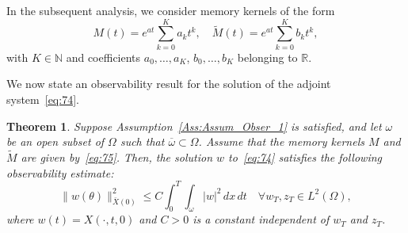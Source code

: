 \documentclass[12pt]{article}
\theoremstyle{plain}
\newtheorem{theorem}{Theorem}[section]
\theoremstyle{definition}
\begin{document}
In the subsequent analysis, we consider memory kernels of the form
\begin{equation}
\label{eq:75}
M(t) = e^{at}\sum_{k=0}^K a_k t^k, \quad \widetilde{M}(t) = e^{at} \sum_{k=0}^K b_k t^k,
\end{equation}
with $K \in \mathbb{N}$ and coefficients $a_0, \dots, a_K$, $b_0, \dots, b_K$ belonging to $\mathbb{R}$.

We now state an observability result for the solution of the adjoint system~\eqref{eq:74}.

\begin{theorem}\label{The:The_Obs_1}
Suppose Assumption~\ref{Ass:Assum_Obser_1} is satisfied, and let $\omega$ be an open subset of $\Omega$ such that $\overline{\omega} \subset \Omega$. Assume that the memory kernels $M$ and $\widetilde{M}$ are given by~\eqref{eq:75}. Then, the solution $w$ to~\eqref{eq:74} satisfies the following observability estimate:
\begin{equation}
\label{eq:76}
\|w(\theta)\|_{\bar{X}(0)}^2 \leq C \int_0^T \int_\omega |w|^2 \, dx\,dt \quad \forall w_T, z_T \in L^2(\Omega),
\end{equation}
where $w(t) = X(\cdot, t, 0)$ and $C > 0$ is a constant independent of $w_T$ and $z_T$.
\end{theorem}
\end{document}

